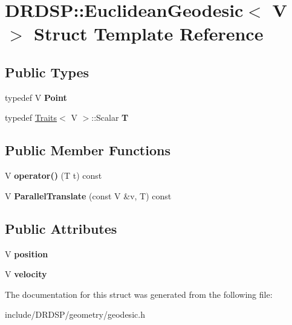 \hypertarget{struct_d_r_d_s_p_1_1_euclidean_geodesic}{\section{D\-R\-D\-S\-P\-:\-:Euclidean\-Geodesic$<$ V $>$ Struct Template Reference}
\label{struct_d_r_d_s_p_1_1_euclidean_geodesic}
}
\subsection*{Public Types}
\begin{DoxyCompactItemize}
\item 
\hypertarget{struct_d_r_d_s_p_1_1_euclidean_geodesic_a2d680202c1b8052de7b66eeecdfdc172}{typedef V {\bfseries Point}}\label{struct_d_r_d_s_p_1_1_euclidean_geodesic_a2d680202c1b8052de7b66eeecdfdc172}

\item 
\hypertarget{struct_d_r_d_s_p_1_1_euclidean_geodesic_a48f7ccb01a9318db94fe83667c4081c3}{typedef \hyperlink{struct_d_r_d_s_p_1_1_traits}{Traits}$<$ V $>$\-::Scalar {\bfseries T}}\label{struct_d_r_d_s_p_1_1_euclidean_geodesic_a48f7ccb01a9318db94fe83667c4081c3}

\end{DoxyCompactItemize}
\subsection*{Public Member Functions}
\begin{DoxyCompactItemize}
\item 
\hypertarget{struct_d_r_d_s_p_1_1_euclidean_geodesic_ac6ebb89dcf49e9b49cd09459a7c6c3c9}{V {\bfseries operator()} (T t) const }\label{struct_d_r_d_s_p_1_1_euclidean_geodesic_ac6ebb89dcf49e9b49cd09459a7c6c3c9}

\item 
\hypertarget{struct_d_r_d_s_p_1_1_euclidean_geodesic_a6f60293cc23e35b9ec0bfbc81ca0d3dc}{V {\bfseries Parallel\-Translate} (const V \&v, T) const }\label{struct_d_r_d_s_p_1_1_euclidean_geodesic_a6f60293cc23e35b9ec0bfbc81ca0d3dc}

\end{DoxyCompactItemize}
\subsection*{Public Attributes}
\begin{DoxyCompactItemize}
\item 
\hypertarget{struct_d_r_d_s_p_1_1_euclidean_geodesic_afe3a4283421a10c3afc8d26cc470c2ef}{V {\bfseries position}}\label{struct_d_r_d_s_p_1_1_euclidean_geodesic_afe3a4283421a10c3afc8d26cc470c2ef}

\item 
\hypertarget{struct_d_r_d_s_p_1_1_euclidean_geodesic_a47f27a24d96442f0a80e7f82424723ce}{V {\bfseries velocity}}\label{struct_d_r_d_s_p_1_1_euclidean_geodesic_a47f27a24d96442f0a80e7f82424723ce}

\end{DoxyCompactItemize}


The documentation for this struct was generated from the following file\-:\begin{DoxyCompactItemize}
\item 
include/\-D\-R\-D\-S\-P/geometry/geodesic.\-h\end{DoxyCompactItemize}
